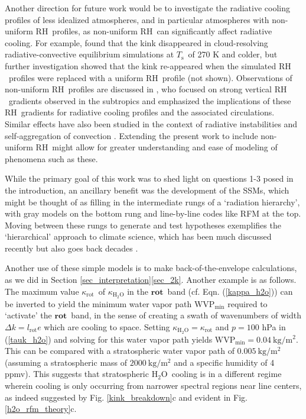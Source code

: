 \documentclass{ametsoc}
\newcommand{\eqnref}[1]{(\ref{#1})}
\newcommand{\kg}{\ensuremath{\mathrm{kg}}}
\newcommand{\meter}{\ensuremath{\mathrm{m}}}
\newcommand{\Ts}{\ensuremath{T_\mathrm{s}}}
\newcommand{\htwo}{\ensuremath{\mathrm{H_2O}}}
\newcommand{\RH}{\ensuremath{\mathrm{RH}}}
\newcommand{\WVP}{\ensuremath{\mathrm{WVP}}}
\newcommand{\kapparot}{\ensuremath{\kappa_{\mathrm{rot}}}}
\newcommand{\lrot}{\ensuremath{l_\mathrm{rot}}}
\newcommand{\rot}{\ensuremath{\textbf{rot}}}
\begin{document}
Another direction for future work would be to investigate the radiative cooling profiles of less idealized atmospheres, and in particular atmospheres with non-uniform \RH\ profiles, as non-uniform \RH\   can significantly affect radiative cooling. For example,  \cite{seeley2019b} found that the kink disappeared in cloud-resolving radiative-convective equilibrium simulations at \Ts\ of 270 K and colder, but further investigation showed that the kink re-appeared when the simulated \RH\ profiles were replaced with a uniform \RH\ profile (not shown). Observations of non-uniform \RH\ profiles are discussed in \cite{stevens2017},  who focused on strong vertical \RH\ gradients observed in the subtropics and   emphasized  the implications of these \RH\ gradients for radiative cooling profiles and the  associated circulations. Similar effects have also been studied in the context of radiative instabilities and self-aggregation of convection \citep{beucler2018,beucler2016,emanuel2014}. Extending the present work to include non-uniform \RH\ might allow for greater understanding and  ease of modeling of phenomena such as these. 

While the primary goal of this work was to shed light on questions 1-3 posed in the introduction, an ancillary benefit was the development of the SSMs, which might be thought of as filling in the intermediate rungs of a `radiation hierarchy', with gray models on the bottom rung and line-by-line codes like RFM at the top. Moving between these rungs to generate and test hypotheses exemplifies the `hierarchical' approach to climate science, which has been much discussed recently but also goes back decades \citep{maher2019,jeevanjee2017a,polvani2017, held2005, hoskins1983,schneider1974}. 

Another use of these simple models is to make back-of-the-envelope calculations, as we did in Section \ref{sec_interpretation}\ref{sec_2k}. Another example is as follows. The maximum value \kapparot\ of $\kappa_{\htwo}$ in the \rot\ band (cf. Eqn. \eqnref{kappa_h2o}) can be inverted  to yield the minimum water vapor path $\WVP_{\mathrm{min}}$ required to `activate' the \rot\ band, in the sense of creating a swath of wavenumbers of width $\Delta k = \lrot e$  which are cooling to space. Setting $\kappa_{\htwo} = \kapparot$ and $p=100$ hPa in \eqnref{tauk_h2o}  and solving for this water vapor path yields $\WVP_{\mathrm{min}} = 0.04\ \kg/\meter^2$. This can be compared with a stratospheric water vapor path of $0.005 \ \kg/\meter^2$  (assuming a stratospheric mass of  $2000\ \kg/\meter^2$ and a specific humidity of 4 ppmv). This suggests that stratospheric \htwo\ cooling is in a different regime wherein cooling is only occurring from narrower spectral regions near line centers, as indeed suggested by Fig. \ref{kink_breakdown}c and evident in Fig. \ref{h2o_rfm_theory}c. 
\end{document}
